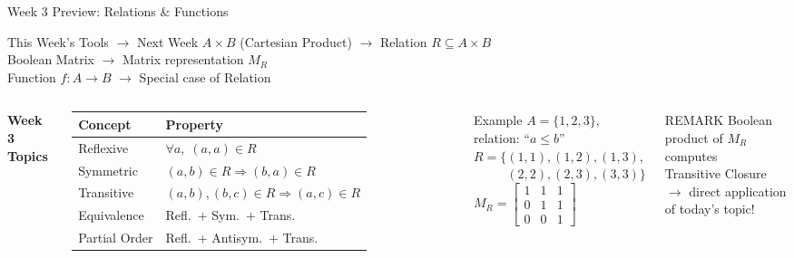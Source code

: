 \documentclass{beamer}
\begin{document}
\begin{frame}[t,shrink=5]{Week 3 Preview: Relations \& Functions}
    \small
    \vspace{0.1cm}
    \begin{block}{This Week's Tools $\to$ Next Week}
        \footnotesize
        $A \times B$ (Cartesian Product) $\to$ Relation $R \subseteq A \times B$\\
        Boolean Matrix $\to$ Matrix representation $M_R$\\
        Function $f: A \to B$ $\to$ Special case of Relation
    \end{block}

    \vspace{0.08cm}
    \begin{columns}[T]
        \textbf{Week 3 Topics}
        \vspace{0.03cm}

        \footnotesize
        \renewcommand{\arraystretch}{1.2}
        \begin{tabular}{ll}
            \toprule
            \textbf{Concept} & \textbf{Property} \\
            \midrule
            Reflexive & $\forall a,\; (a,a) \in R$ \\
            Symmetric & $(a,b) \in R \Rightarrow (b,a) \in R$ \\
            Transitive & $(a,b),(b,c) \in R \Rightarrow (a,c) \in R$ \\
            \midrule
            Equivalence & Refl.\ $+$ Sym.\ $+$ Trans. \\
            Partial Order & Refl.\ $+$ Antisym.\ $+$ Trans. \\
            \bottomrule
        \end{tabular}
        \renewcommand{\arraystretch}{1}

        \begin{exampleblock}{Example}
            \footnotesize
            $A = \{1,2,3\}$, relation: ``$a \leq b$''\\[3pt]
            $R = \{(1,1),(1,2),(1,3),$\\
            $\phantom{R = \{}(2,2),(2,3),(3,3)\}$\\[3pt]
            $M_R = \begin{bmatrix}1&1&1\\0&1&1\\0&0&1\end{bmatrix}$
        \end{exampleblock}

        \vspace{0.05cm}
        \begin{alertblock}{\scriptsize REMARK}
            \scriptsize Boolean product of $M_R$ computes\\
            Transitive Closure\\
            $\to$ direct application of today's topic!
        \end{alertblock}
    \end{columns}
\end{frame}
\end{document}
